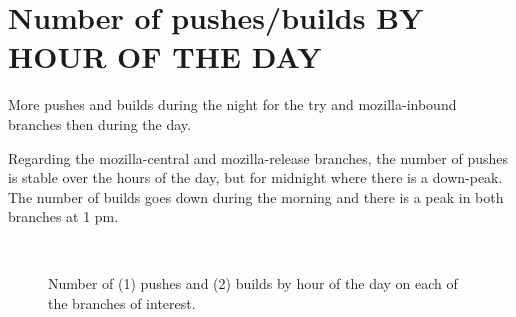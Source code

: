 \section{Number of pushes/builds BY HOUR OF THE DAY}

More pushes and builds during the night for the try and mozilla-inbound branches then during the day. 

Regarding the mozilla-central and mozilla-release branches, the number of pushes is stable over the hours of the day, but for midnight where there is a down-peak. The number of builds goes down during the morning and there is a peak in both branches at 1 pm.


\begin{figure}[h]
    \hfill
    \\
    \caption{\label{hour} Number of (1) pushes and (2) builds by hour of the day on each of the branches of interest.}
\end{figure}

